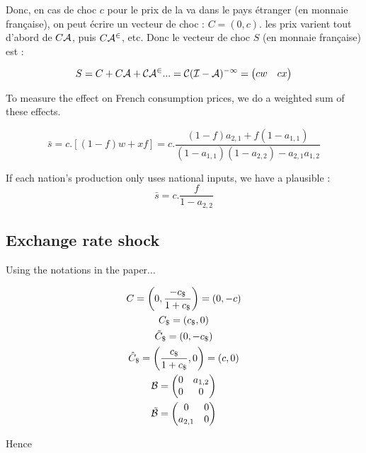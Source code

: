 \documentclass[11pt,a4paper]{article}
\begin{document}
Donc, en cas de choc $c$ pour le prix de la va dans le pays étranger (en monnaie française), on peut écrire un vecteur de choc : $C=\left(0,c\right)$.  les prix varient tout d'abord de  $C\cal {A}$, puis $C\cal {A}^2$, etc. Donc le vecteur de choc $S$ (en monnaie française) est : 


\begin{equation*}
S=C+C\cal {A}+C\cal {A}^2...=C(I-\cal {A})^{-1}=\left(\begin{matrix}cw  &   cx\end{matrix}\right)
\end{equation*}

To measure the effect on French consumption prices, we do a weighted sum of these effects.

\begin{equation}
\bar{s}=c.\left[\left(1-f\right)w+xf\right]=c.\frac{\left(1-f\right)a_{2,1}+f\left(1-a_{1,1}\right)}{\left(1-a_{1,1}\right)\left(1-a_{2,2}\right)-a_{2,1}a_{1,2}}
\end{equation}

If each nation's production only uses national inputs, we have a plausible :
\begin{equation*}
\bar{s}=c.\frac{f}{1-a_{2,2}}
\end{equation*}

\subsection{Exchange rate shock}

Using the notations in the paper...

\begin{gather*}
C=\left(0,\frac{-c_\$}{1+c_\$}\right)=\left(0,-c\right)
\\
C_\$=\left(c_\$,0\right)
\\
\tilde{C}_\$=\left(0,-c_\$\right)
\\
\hat{C}_\$=\left(\frac{c_\$}{1+c_\$},0\right)=\left(c,0\right)
\\
\cal B = \left(\begin{matrix}0&a_{1,2}\\0&0\end{matrix}\right)
\\
\tilde{\cal B} = \left(\begin{matrix}0&0\\a_{2,1}&0\end{matrix}\right)
\end{gather*}

Hence
\end{document}
